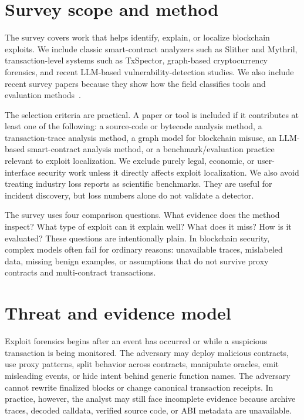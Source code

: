 \documentclass[conference]{IEEEtran}
\begin{document}
\section{Survey scope and method}

The survey covers work that helps identify, explain, or localize blockchain exploits. We include classic smart-contract analyzers such as Slither and Mythril, transaction-level systems such as TxSpector, graph-based cryptocurrency forensics, and recent LLM-based vulnerability-detection studies. We also include recent survey papers because they show how the field classifies tools and evaluation methods~\cite{survey_access_2024}.

The selection criteria are practical. A paper or tool is included if it contributes at least one of the following: a source-code or bytecode analysis method, a transaction-trace analysis method, a graph model for blockchain misuse, an LLM-based smart-contract analysis method, or a benchmark/evaluation practice relevant to exploit localization. We exclude purely legal, economic, or user-interface security work unless it directly affects exploit localization. We also avoid treating industry loss reports as scientific benchmarks. They are useful for incident discovery, but loss numbers alone do not validate a detector.

The survey uses four comparison questions. What evidence does the method inspect? What type of exploit can it explain well? What does it miss? How is it evaluated? These questions are intentionally plain. In blockchain security, complex models often fail for ordinary reasons: unavailable traces, mislabeled data, missing benign examples, or assumptions that do not survive proxy contracts and multi-contract transactions.

\section{Threat and evidence model}

Exploit forensics begins after an event has occurred or while a suspicious transaction is being monitored. The adversary may deploy malicious contracts, use proxy patterns, split behavior across contracts, manipulate oracles, emit misleading events, or hide intent behind generic function names. The adversary cannot rewrite finalized blocks or change canonical transaction receipts. In practice, however, the analyst may still face incomplete evidence because archive traces, decoded calldata, verified source code, or ABI metadata are unavailable.
\end{document}
